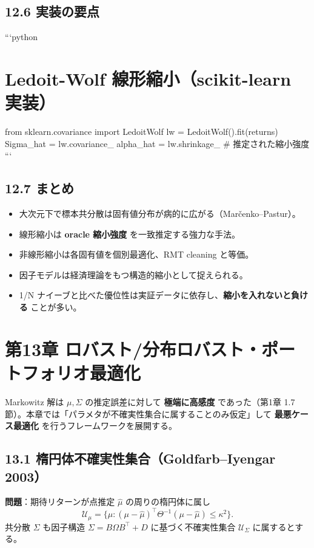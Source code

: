 \documentclass[11pt,a4paper]{report}
\begin{document}
\section{12.6 実装の要点}

```python
\chapter{Ledoit-Wolf 線形縮小（scikit-learn 実装）}
from sklearn.covariance import LedoitWolf lw = LedoitWolf().fit(returns) Sigma\_hat = lw.covariance\_ alpha\_hat = lw.shrinkage\_  \# 推定された縮小強度 ```

\section{12.7 まとめ}

\begin{itemize}
\item 大次元下で標本共分散は固有値分布が病的に広がる（Marčenko–Pastur）。
\item 線形縮小は \textbf{oracle 縮小強度} を一致推定する強力な手法。
\item 非線形縮小は各固有値を個別最適化、RMT cleaning と等価。
\item 因子モデルは経済理論をもつ構造的縮小として捉えられる。
\item 1/N ナイーブと比べた優位性は実証データに依存し、\textbf{縮小を入れないと負ける} ことが多い。
\end{itemize}

\noindent\hrulefill

\chapter{第13章 ロバスト/分布ロバスト・ポートフォリオ最適化}

Markowitz 解は $\mu, \Sigma$ の推定誤差に対して \textbf{極端に高感度} であった（第1章 1.7 節）。本章では「パラメタが不確実性集合に属することのみ仮定」して \textbf{最悪ケース最適化} を行うフレームワークを展開する。

\section{13.1 楕円体不確実性集合（Goldfarb–Iyengar 2003）}

\textbf{問題}：期待リターンが点推定 $\hat\mu$ の周りの楕円体に属し \[ \mathcal{U}_\mu = \{ \mu : (\mu - \hat\mu)^\top \Theta^{-1} (\mu - \hat\mu) \le \kappa^2 \}. \] 共分散 $\Sigma$ も因子構造 $\Sigma = B \Omega B^\top + D$ に基づく不確実性集合 $\mathcal{U}_\Sigma$ に属するとする。
\end{document}
